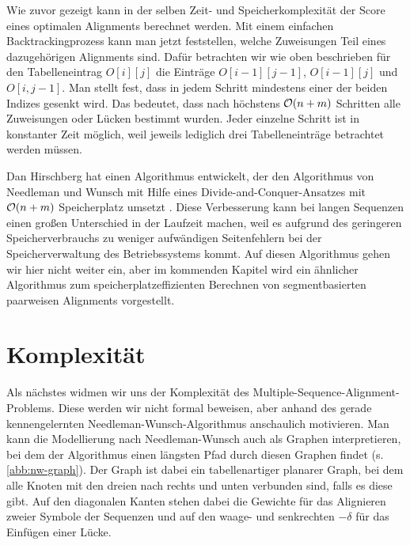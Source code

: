 \begin{beweis}
	Wie zuvor gezeigt kann in der selben Zeit- und Speicherkomplexität der Score eines optimalen Alignments berechnet werden. Mit einem einfachen Backtrackingprozess kann man jetzt feststellen, welche Zuweisungen Teil eines dazugehörigen Alignments sind. Dafür betrachten wir wie oben beschrieben für den Tabelleneintrag $O[i][j]$ die Einträge  $O[i-1][j-1]$, $O[i-1][j]$ und $O[i,j-1]$. Man stellt fest, dass in jedem Schritt mindestens einer der beiden Indizes gesenkt wird. Das bedeutet, dass nach höchstens $\mathcal{O}(n+m)$ Schritten alle Zuweisungen oder Lücken bestimmt wurden. Jeder einzelne Schritt ist in konstanter Zeit möglich, weil jeweils lediglich drei Tabelleneinträge betrachtet werden müssen. 
\end{beweis}

Dan Hirschberg hat einen Algorithmus entwickelt, der den Algorithmus von Needleman und Wunsch mit Hilfe eines Divide-and-Conquer-Ansatzes mit $\mathcal{O}(n+m)$ Speicherplatz umsetzt \cite{h75}. Diese Verbesserung kann bei langen Sequenzen einen großen Unterschied in der Laufzeit machen, weil es aufgrund des geringeren Speicherverbrauchs zu weniger aufwändigen Seitenfehlern bei der Speicherverwaltung des Betriebssystems kommt. Auf diesen Algorithmus gehen wir hier nicht weiter ein, aber im kommenden Kapitel wird ein ähnlicher Algorithmus zum speicherplatzeffizienten Berechnen von segmentbasierten paarweisen Alignments vorgestellt.

\section{Komplexität}

Als nächstes widmen wir uns der Komplexität des Multiple-Sequence-Alignment-Problems. Diese werden wir nicht formal beweisen, aber anhand des gerade kennengelernten Needleman-Wunsch-Algorithmus anschaulich motivieren. Man kann die Modellierung nach Needleman-Wunsch auch als Graphen interpretieren, bei dem der Algorithmus einen längsten Pfad durch diesen Graphen findet (s. \ref{abb:nw-graph}). Der Graph ist dabei ein tabellenartiger planarer Graph, bei dem alle Knoten mit den dreien nach rechts und unten verbunden sind, falls es diese gibt. Auf den diagonalen Kanten stehen dabei die Gewichte für das Alignieren zweier Symbole der Sequenzen und auf den waage- und senkrechten $-\delta$ für das Einfügen einer Lücke.

